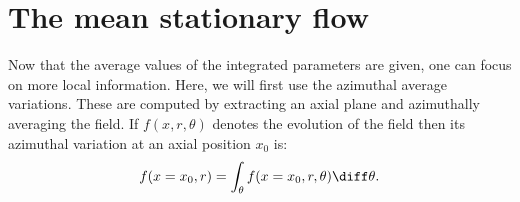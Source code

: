 \section{The mean stationary flow}
\label{sec:ca_general_flow_physics}

Now that the average values of the integrated parameters are given,
one can focus on more local information. Here, we will first use
the azimuthal average variations. These are computed by extracting
an axial plane and azimuthally averaging the field. If $f(x, r, \theta)$
denotes the evolution of the field then its azimuthal variation at
an axial position $x_0$ is:
\begin{equation}
    f(x=x_0, r) = \int_{\theta} f(x=x_0, r, \theta) \diff \theta.
\end{equation}




